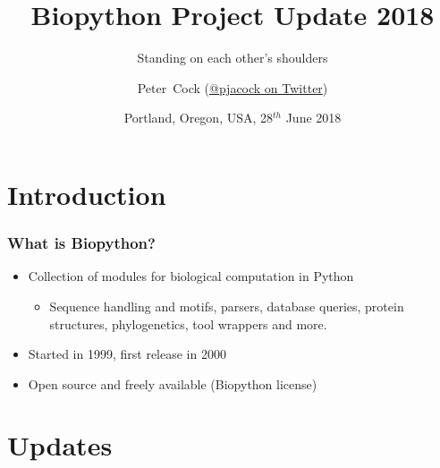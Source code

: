 

\usepackage{multicol}

\title[Biopython Project Update 2018] %
{Biopython Project Update 2018}
\subtitle{Standing on each other's shoulders}
\author[Cock] %
{Peter~Cock (\href{https://twitter.com/pjacock}{@pjacock on Twitter})}
\date[June 2018] %
{Portland, Oregon, USA, 28$^{th}$ June 2018}
\subject{Bioinformatics}





\frame[plain]{\titlepage}

\section{Introduction}

\begin{frame}
  \frametitle{What is Biopython?}

  \begin{itemize}
  \item Collection of modules for biological computation in Python
  \begin{itemize}
  \item Sequence handling and motifs, parsers, database queries, protein structures, phylogenetics, tool wrappers and more.
  \end{itemize}
  \item Started in 1999, first release in 2000
  \item Open source and freely available (Biopython license)
  \end{itemize}

\end{frame}

\section{Updates}

